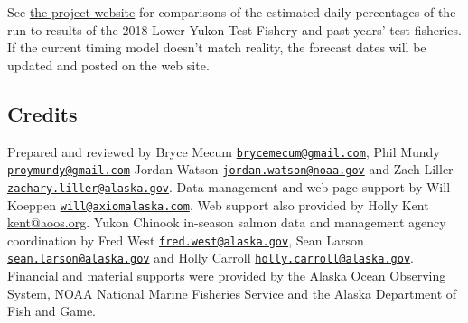 \documentclass[]{article}
\begin{document}
See
\href{http://www.aoos.org/2018-run-timing-outlook-and-forecast-summary-chinook-salmon-yukon-river-delta/}{the
project website} for comparisons of the estimated daily percentages of
the run to results of the 2018 Lower Yukon Test Fishery and past years'
test fisheries. If the current timing model doesn't match reality, the
forecast dates will be updated and posted on the web site.

\hypertarget{credits}{%
\subsection{Credits}\label{credits}}

Prepared and reviewed by Bryce Mecum
\href{mailto:brycemecum@gmail.com}{\nolinkurl{brycemecum@gmail.com}},
Phil Mundy
\href{mailto:proymundy@gmail.com}{\nolinkurl{proymundy@gmail.com}}
Jordan Watson
\href{mailto:jordan.watson@noaa.gov}{\nolinkurl{jordan.watson@noaa.gov}}
and Zach Liller
\href{mailto:zachary.liller@alaska.gov}{\nolinkurl{zachary.liller@alaska.gov}}.
Data management and web page support by Will Koeppen
\href{mailto:will@axiomalaska.com}{\nolinkurl{will@axiomalaska.com}}.
Web support also provided by Holly Kent
\href{mailto:\%20kent@aoos.org}{kent@aoos.org}. Yukon Chinook in-season
salmon data and management agency coordination by Fred West
\href{mailto:fred.west@alaska.gov}{\nolinkurl{fred.west@alaska.gov}},
Sean Larson
\href{mailto:sean.larson@alaska.gov}{\nolinkurl{sean.larson@alaska.gov}}
and Holly Carroll
\href{mailto:holly.carroll@alaska.gov}{\nolinkurl{holly.carroll@alaska.gov}}.
Financial and material supports were provided by the Alaska Ocean
Observing System, NOAA National Marine Fisheries Service and the Alaska
Department of Fish and Game.
\end{document}
